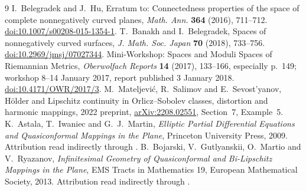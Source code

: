 \documentclass[11pt]{article}
\begin{document}
\begin{thebibliography}{9}
 I.~Belegradek and J.~Hu,
Erratum to: Connectedness properties of the space of complete nonnegatively curved planes,
\emph{Math. Ann.} \textbf{364} (2016), 711--712.
\href{https://doi.org/10.1007/s00208-015-1354-1}{doi:10.1007/s00208-015-1354-1}.
 T.~Banakh and I.~Belegradek,
Spaces of nonnegatively curved surfaces,
\emph{J. Math. Soc. Japan} \textbf{70} (2018), 733--756.
\href{https://doi.org/10.2969/jmsj/07027344}{doi:10.2969/jmsj/07027344}.
 Mini-Workshop: Spaces and Moduli Spaces of Riemannian Metrics,
\emph{Oberwolfach Reports} \textbf{14} (2017), 133--166, especially p.~149;
workshop 8--14 January 2017, report published 3 January 2018.
\href{https://doi.org/10.4171/OWR/2017/3}{doi:10.4171/OWR/2017/3}.
 M.~Mateljevi\'c, R.~Salimov and E.~Sevost'yanov,
H\"older and Lipschitz continuity in Orlicz--Sobolev classes, distortion and harmonic mappings,
2022 preprint, \href{https://arxiv.org/abs/2208.02551}{arXiv:2208.02551}, Section~7, Example~5.
 K.~Astala, T.~Iwaniec and G.~J.~Martin,
\emph{Elliptic Partial Differential Equations and Quasiconformal Mappings in the Plane},
Princeton University Press, 2009. Attribution read indirectly through \cite{MSS22}.
 B.~Bojarski, V.~Gutlyanskii, O.~Martio and V.~Ryazanov,
\emph{Infinitesimal Geometry of Quasiconformal and Bi-Lipschitz Mappings in the Plane},
EMS Tracts in Mathematics 19, European Mathematical Society, 2013.
Attribution read indirectly through \cite{MSS22}.
\end{thebibliography}
\end{document}

